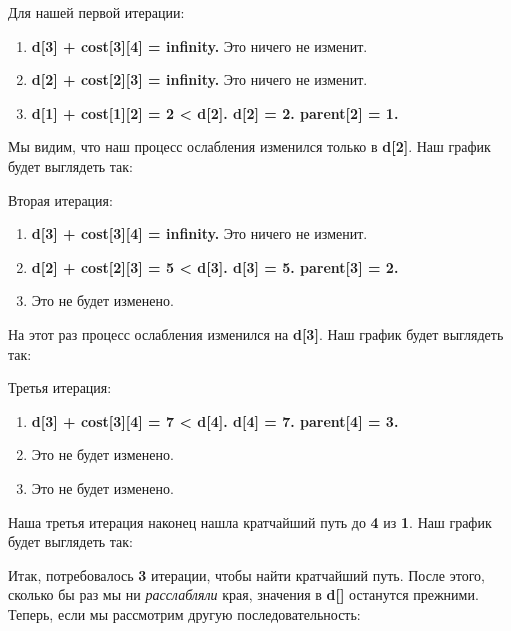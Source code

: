 Для нашей первой итерации:

\begin{enumerate}
\item \textbf{d[3] + cost[3][4] = infinity.} Это ничего не изменит.
\item \textbf{d[2] + cost[2][3] = infinity.} Это ничего не изменит.
\item \textbf{d[1] + cost[1][2] = 2 < d[2]. d[2] = 2. parent[2] = 1.}
\end{enumerate}

Мы видим, что наш процесс ослабления изменился только в \textbf{d[2]}. Наш график будет
выглядеть так:


Вторая итерация:

\begin{enumerate}
\item \textbf{d[3] + cost[3][4] = infinity.} Это ничего не изменит.
\item \textbf{d[2] + cost[2][3] = 5 < d[3]. d[3] = 5. parent[3] = 2.}
\item Это не будет изменено.
\end{enumerate}

На этот раз процесс ослабления изменился на \textbf{d[3]}. Наш график будет выглядеть так:


Третья итерация:

\begin{enumerate}
\item \textbf{d[3] + cost[3][4] = 7 < d[4]. d[4] = 7. parent[4] = 3.}
\item Это не будет изменено.
\item Это не будет изменено.
\end{enumerate}

Наша третья итерация наконец нашла кратчайший путь до \textbf{4} из \textbf{1}. Наш график будет выглядеть так:


Итак, потребовалось \textbf{3} итерации, чтобы найти кратчайший путь. После этого, сколько бы раз мы ни \textit{расслабляли} края, значения в \textbf{d[]} останутся прежними. Теперь, если мы рассмотрим другую последовательность:

